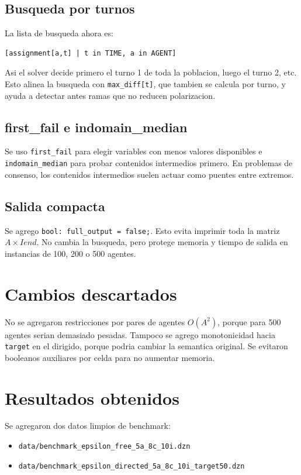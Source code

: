 \documentclass[11pt,a4paper]{article}
\begin{document}
\subsection{Busqueda por turnos}
La lista de busqueda ahora es:
\begin{lstlisting}
[assignment[a,t] | t in TIME, a in AGENT]
\end{lstlisting}
Asi el solver decide primero el turno 1 de toda la poblacion, luego el turno 2, etc. Esto alinea la busqueda con \texttt{max\_diff[t]}, que tambien se calcula por turno, y ayuda a detectar antes ramas que no reducen polarizacion.

\subsection{first\_fail e indomain\_median}
Se uso \texttt{first\_fail} para elegir variables con menos valores disponibles e \texttt{indomain\_median} para probar contenidos intermedios primero. En problemas de consenso, los contenidos intermedios suelen actuar como puentes entre extremos.

\subsection{Salida compacta}
Se agrego \texttt{bool: full\_output = false;}. Esto evita imprimir toda la matriz \(A\times Iend\). No cambia la busqueda, pero protege memoria y tiempo de salida en instancias de 100, 200 o 500 agentes.

\section{Cambios descartados}
No se agregaron restricciones por pares de agentes \(O(A^2)\), porque para 500 agentes serian demasiado pesadas. Tampoco se agrego monotonicidad hacia \texttt{target} en el dirigido, porque podria cambiar la semantica original. Se evitaron booleanos auxiliares por celda para no aumentar memoria.

\section{Resultados obtenidos}
Se agregaron dos datos limpios de benchmark:
\begin{itemize}
  \item \texttt{data/benchmark\_epsilon\_free\_5a\_8c\_10i.dzn}
  \item \texttt{data/benchmark\_epsilon\_directed\_5a\_8c\_10i\_target50.dzn}
\end{itemize}
\end{document}
